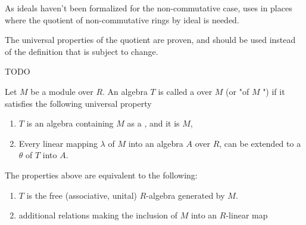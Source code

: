 \begin{remark}
    \label{mk:RingQuot}

    As ideals haven't been formalized for the non-commutative case, \Mathlib uses  in places
    where the quotient of non-commutative rings by ideal is needed.

    The universal properties of the quotient are proven, and should be used instead of the definition that is subject to change.
    
\end{remark}

\begin{definition}
    \label{TensorAlgebra_Rel}

    TODO

\end{definition}

\begin{definition}
    \label{TensorAlgebra}

    Let $M$ be a module over $R$. An algebra $T$ is called a  over $M$ (or "of $M$ ")
    if it satisfies the following universal property

    \begin{enumerate}
    \item $T$ is an algebra containing $M$ as a , and it is  $M$,
    \item Every linear mapping $\lambda$ of $M$ into an algebra $A$ over $R$, can be extended to 
    a  $\theta$ of $T$ into $A$.
    \end{enumerate}

\end{definition}

\begin{remark}
    \label{mk:TensorAlgebra}

    The properties above are equivalent to the following:

    \begin{enumerate}
        \item $T$ is the free (associative, unital) $R$-algebra generated by $M$.
        \item additional relations making the inclusion of $M$ into an $R$-linear map
    \end{enumerate}
    
\end{remark}
